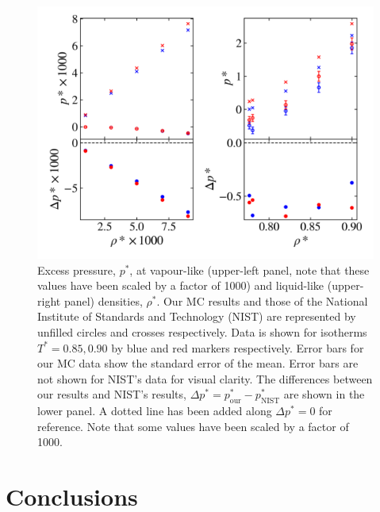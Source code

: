 \documentclass[10pt, twocolumn]{revtex4}    %
\begin{document}
\begin{figure}
	\includegraphics[width=\linewidth]{figures/NIST_comparison/NIST_p.png}
	\caption{Excess pressure, $p^{*}$, at vapour-like (upper-left panel, note that these values have been scaled by a factor of 1000) and liquid-like (upper-right panel) densities, $\rho{}^{*}$. Our MC results and those of the National Institute of Standards and Technology (NIST) are represented by unfilled circles and crosses respectively. Data is shown for isotherms $T^{*}=0.85, 0.90$ by blue and red markers respectively. Error bars for our MC data show the standard error of the mean. Error bars are not shown for NIST's data for visual clarity. The differences between our results and NIST's results, $\Delta{}p^{*} = p_\text{our}^{*} - p_\text{NIST}^{*}$ are shown in the lower panel. A dotted line has been added along $\Delta{}p^{*}=0$ for reference. Note that some values have been scaled by a factor of 1000.}
	\label{fig:NIST_p}
\end{figure}




\section{Conclusions} \label{s:conclusions}
\end{document}
